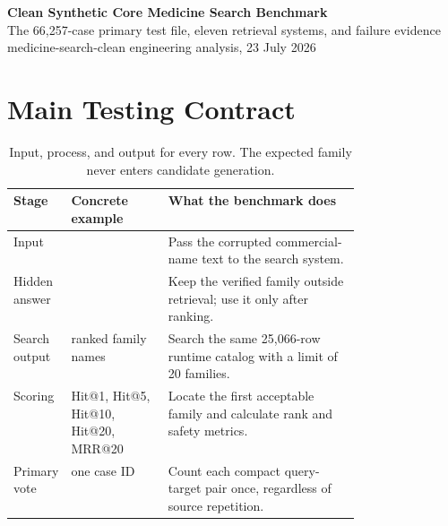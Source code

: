\documentclass[11pt,a4paper]{article}
\newcommand{\code}[1]{\texttt{\seqsplit{#1}}}
\begin{document}
\begin{center}
{\LARGE\textbf{Clean Synthetic Core Medicine Search Benchmark}}\\[2pt]
{\large The 66,257-case primary test file, eleven retrieval systems, and failure evidence}\\[3pt]
{\small medicine-search-clean engineering analysis, 23 July 2026}
\end{center}
\vspace{0.25em}

\begin{center}
\end{center}

\section{Main Testing Contract}

\begin{table}[H]
\centering
\small
\begin{tabularx}{\linewidth}{@{}L{0.16\linewidth}L{0.29\linewidth}Y@{}}
\toprule
\textbf{Stage} & \textbf{Concrete example} & \textbf{What the benchmark does} \\
\midrule
Input & \code{0aflon} & Pass the corrupted commercial-name text to the search system. \\
Hidden answer & \code{DAFLON} & Keep the verified family outside retrieval; use it only after ranking. \\
Search output & ranked family names & Search the same 25,066-row runtime catalog with a limit of 20 families. \\
Scoring & Hit@1, Hit@5, Hit@10, Hit@20, MRR@20 & Locate the first acceptable family and calculate rank and safety metrics. \\
Primary vote & one case ID & Count each compact query-target pair once, regardless of source repetition. \\
\bottomrule
\end{tabularx}
\caption{Input, process, and output for every row. The expected family never enters candidate generation.}
\label{tab:contract}
\end{table}
\end{document}
